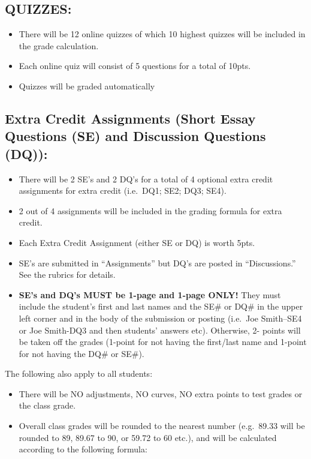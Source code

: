 \documentclass[11pt,]{article}
\providecommand{\tightlist}{%
  \setlength{\itemsep}{0pt}\setlength{\parskip}{0pt}}
\begin{document}
\hypertarget{quizzes}{%
\subsection{QUIZZES:}\label{quizzes}}

\begin{itemize}
\tightlist
\item
  There will be 12 online quizzes of which 10 highest quizzes will be included in the grade
  calculation.
\item
  Each online quiz will consist of 5 questions for a total of 10pts.
\item
  Quizzes will be graded automatically
\end{itemize}

\hypertarget{extra-credit-assignments-short-essay-questions-se-and-discussion-questions-dq}{%
\subsection{Extra Credit Assignments (Short Essay Questions (SE) and Discussion Questions (DQ)):}\label{extra-credit-assignments-short-essay-questions-se-and-discussion-questions-dq}}

\begin{itemize}
\tightlist
\item
  There will be 2 SE's and 2 DQ's for a total of 4 optional extra credit assignments for extra
  credit (i.e.~DQ1; SE2; DQ3; SE4).
\item
  2 out of 4 assignments will be included in the grading formula for extra credit.
\item
  Each Extra Credit Assignment (either SE or DQ) is worth 5pts.
\item
  SE's are submitted in ``Assignments'' but DQ's are posted in ``Discussions.'' See the rubrics for
  details.
\item
  \textbf{SE's and DQ's MUST be 1-page and 1-page ONLY!} They must include the student's first and
  last names and the SE\# or DQ\# in the upper left corner and in the body of the submission or
  posting (i.e.~Joe Smith--SE4 or Joe Smith-DQ3 and then students' answers etc). Otherwise, 2-
  points will be taken off the grades (1-point for not having the first/last name and 1-point for not
  having the DQ\# or SE\#).
\end{itemize}

The following also apply to all students:

\begin{itemize}
\tightlist
\item
  There will be NO adjustments, NO curves, NO extra points to test grades or the class grade.
\item
  Overall class grades will be rounded to the nearest number (e.g.~89.33 will be rounded to 89, 89.67 to
  90, or 59.72 to 60 etc.), and will be calculated according to the following formula:
\end{itemize}
\end{document}
